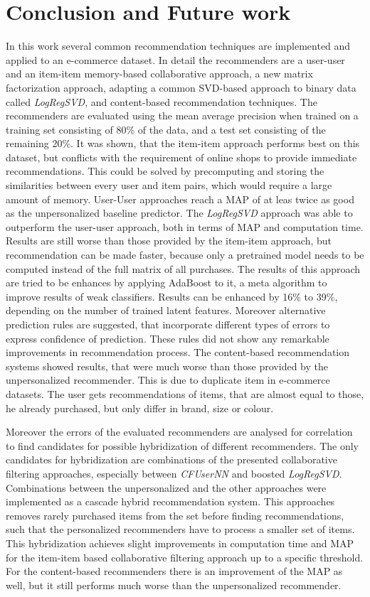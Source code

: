 \documentclass[10pt]{reportMaster}
\begin{document}
\chapter{Conclusion and Future work}
\label{chap:conclusionAndFutureWork}
In this work several common recommendation techniques are implemented and applied to an e-commerce dataset.
In detail the recommenders are a user-user and an item-item memory-based collaborative approach, a new matrix factorization approach, adapting a common SVD-based approach to binary data called \textit{LogRegSVD}, and content-based recommendation techniques.
The recommenders are evaluated using the mean average precision when trained on a training set consisting of 80\% of the data, and a test set consisting of the remaining 20\%.
It was shown, that the item-item approach performs best on this dataset, but conflicts with the requirement of online shops to provide immediate recommendations.
This could be solved by precomputing and storing the similarities between every user and item pairs, which would require a large amount of memory.
User-User approaches reach a MAP of at leas twice as good as the unpersonalized baseline predictor.
The \textit{LogRegSVD} approach was able to outperform the user-user approach, both in terms of MAP and computation time.
Results are still worse than those provided by the item-item approach, but recommendation can be made faster, because only a pretrained model needs to be computed instead of the full matrix of all purchases.
The results of this approach are tried to be enhances by applying AdaBoost to it, a meta algorithm to improve results of weak classifiers.
Results can be enhanced by 16\% to 39\%, depending on the number of trained latent features.
Moreover alternative prediction rules are suggested, that incorporate different types of errors to express confidence of prediction.
These rules did not show any remarkable improvements in recommendation process.
The content-based recommendation systems showed results, that were much worse than those provided by the unpersonalized recommender.
This is due to duplicate item in e-commerce datasets.
The user gets recommendations of items, that are almost equal to those, he already purchased, but only differ in brand, size or colour.

Moreover the errors of the evaluated recommenders are analysed for correlation to find candidates for possible hybridization of different recommenders.
The only candidates for hybridization are combinations of the presented collaborative filtering approaches, especially between \textit{CFUserNN} and boosted \textit{LogRegSVD}.
Combinations between the unpersonalized and the other approaches were implemented as a cascade hybrid recommendation system.
This approaches removes rarely purchased items from the set before finding recommendations, such that the personalized recommenders have to process a smaller set of items.
This hybridization achieves slight improvements in computation time and MAP for the item-item based collaborative filtering approach up to a specific threshold.
For the content-based recommenders there is an improvement of the MAP as well, but it still performs much worse than the unpersonalized recommender.
\end{document}
